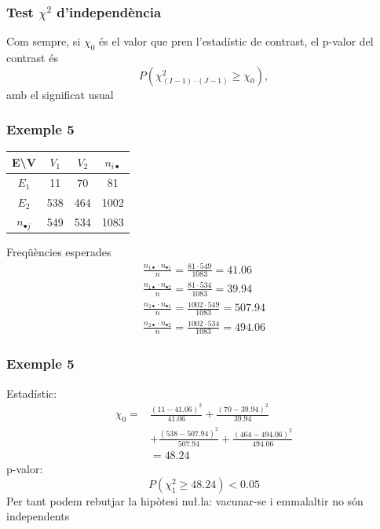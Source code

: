 \documentclass[12pt,t]{beamer}
\renewcommand{\emph}[1]{{\color{red}#1}}
\renewcommand{\geq}{\geqslant}
\theoremstyle{plain}
\theoremstyle{definition}
\begin{document}
\begin{frame}
\frametitle{Test $\chi^2$ d'independència}
Com sempre, si $\chi_0$ és el valor que pren l'estadístic de contrast, el \emph{p-valor} del contrast és
$$
P(\chi_{(I-1) \cdot (J -1)}^2\geq \chi_0),
$$
amb el significat usual
\end{frame}



\begin{frame}
\frametitle{Exemple 5}

\begin{center}
 \begin{tabular}{|c|cc|c|}
 \hline
E\textbackslash V& $V_1$ & $V_2$ & $n_{i\bullet}$\\\hline
$E_1$ &11& 70  & 81\\
$E_2$ & 538 &464& 1002 \\\hline
$n_{\bullet j} $& 549 & 534 & 1083\\
\hline
 \end{tabular}
\end{center}
Freqüències esperades
$$
\begin{array}{ll}
\displaystyle \frac{n_{1\bullet}\cdot n_{\bullet 1} }{n}=\frac{81\cdot 549}{1083}=41.06\\[2ex]
\displaystyle  \frac{n_{1\bullet}\cdot n_{\bullet 2} }{n}=\frac{81\cdot 534}{1083}=39.94\\[2ex]
\displaystyle  \frac{n_{2\bullet}\cdot n_{\bullet 1} }{n}=\frac{1002\cdot 549}{1083}=507.94\\[2ex]
\displaystyle  \frac{n_{2\bullet}\cdot n_{\bullet 2} }{n}=\frac{1002\cdot 534}{1083}=494.06
 \end{array}
 $$
\end{frame}



\begin{frame}
\frametitle{Exemple 5}
Estadístic:
$$
\begin{array}{rl}
\chi_0=& \displaystyle \frac{(11-41.06)^2}{41.06}
+ \frac{(70-39.94)^2}{39.94}\\[2ex]
& +\displaystyle \frac{(538-507.94)^2}{507.94}
+ \frac{(464-494.06)^2}{494.06}\\[2ex]
& = 48.24
\end{array}
$$
p-valor:
$$
P(\chi_1^2\geq 48.24)<0.05
$$
Per tant podem rebutjar la hipòtesi nu\l.la: vacunar-se i emmalaltir no són independents
\end{frame}
\end{document}
